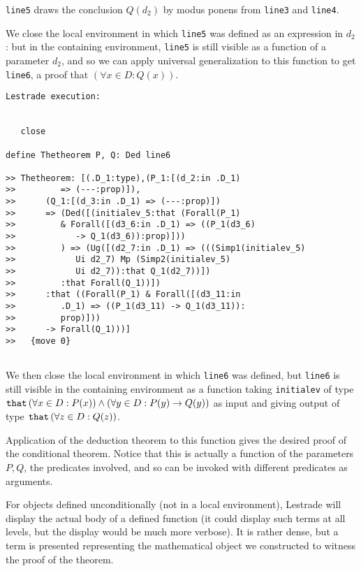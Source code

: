 \documentclass{slides}
\begin{document}
{\tt line5} draws the conclusion $Q(d_2)$ by modus ponens from {\tt line3} and {\tt line4}.

We close the local environment in which {\tt line5} was defined as an expression in $d_2$:  but in the containing environment,
{\tt line5} is still visible as a function of a parameter $d_2$, and so we can apply universal generalization to this function to get
{\tt line6}, a proof that $(\forall x \in D:Q(x))$.

\begin{slide}
{\small 
\begin{verbatim}Lestrade execution:


   close

define Thetheorem P, Q: Ded line6

>> Thetheorem: [(.D_1:type),(P_1:[(d_2:in .D_1)
>>         => (---:prop)]),
>>      (Q_1:[(d_3:in .D_1) => (---:prop)])
>>      => (Ded([(initialev_5:that (Forall(P_1)
>>         & Forall([(d3_6:in .D_1) => ((P_1(d3_6)
>>            -> Q_1(d3_6)):prop)]))
>>         ) => (Ug([(d2_7:in .D_1) => (((Simp1(initialev_5)
>>            Ui d2_7) Mp (Simp2(initialev_5)
>>            Ui d2_7)):that Q_1(d2_7))])
>>         :that Forall(Q_1))])
>>      :that ((Forall(P_1) & Forall([(d3_11:in
>>         .D_1) => ((P_1(d3_11) -> Q_1(d3_11)):
>>         prop)]))
>>      -> Forall(Q_1)))]
>>   {move 0}


\end{verbatim}
}

\end{slide}

\begin{slide}

We then close the local environment in which {\tt line6} was defined, but {\tt line6} is still visible in the containing environment as a function taking {\tt initialev}
of type ${\tt that} \, (\forall x \in D:P(x)) \wedge (\forall y \in D:P(y) \rightarrow Q(y))$ as input and giving output of type ${\tt that}\,(\forall z \in D:Q(z))$.

Application of the deduction theorem to this function gives the desired proof of the conditional theorem.  Notice that this is actually a function of the
parameters $P,Q$, the predicates involved, and so can be invoked with different predicates as arguments.

For objects defined unconditionally (not in a local environment), Lestrade will display the actual body of a defined function (it could display such terms at all levels, but the display would be much more verbose).  It is rather dense, but a term is presented representing the mathematical object we constructed to witness the proof of the theorem.

\end{slide}
\end{document}
